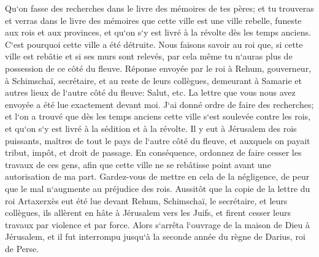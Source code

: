 \verse Qu`on fasse des recherches dans le livre des mémoires de tes pères; et tu trouveras et verras dans le livre des mémoires que cette ville est une ville rebelle, funeste aux rois et aux provinces, et qu`on s`y est livré à la révolte dès les temps anciens. C`est pourquoi cette ville a été détruite. 
\verse Nous faisons savoir au roi que, si cette ville est rebâtie et si ses murs sont relevés, par cela même tu n`auras plus de possession de ce côté du fleuve. 
\verse Réponse envoyée par le roi à Rehum, gouverneur, à Schimschaï, secrétaire, et au reste de leurs collègues, demeurant à Samarie et autres lieux de l`autre côté du fleuve: Salut, etc. 
\verse La lettre que vous nous avez envoyée a été lue exactement devant moi. 
\verse J`ai donné ordre de faire des recherches; et l`on a trouvé que dès les temps anciens cette ville s`est soulevée contre les rois, et qu`on s`y est livré à la sédition et à la révolte. 
\verse Il y eut à Jérusalem des rois puissants, maîtres de tout le pays de l`autre côté du fleuve, et auxquels on payait tribut, impôt, et droit de passage. 
\verse En conséquence, ordonnez de faire cesser les travaux de ces gens, afin que cette ville ne se rebâtisse point avant une autorisation de ma part. 
\verse Gardez-vous de mettre en cela de la négligence, de peur que le mal n`augmente au préjudice des rois. 
\verse Aussitôt que la copie de la lettre du roi Artaxerxès eut été lue devant Rehum, Schimschaï, le secrétaire, et leurs collègues, ils allèrent en hâte à Jérusalem vers les Juifs, et firent cesser leurs travaux par violence et par force. 
\verse Alors s`arrêta l`ouvrage de la maison de Dieu à Jérusalem, et il fut interrompu jusqu`à la seconde année du règne de Darius, roi de Perse. 

\chapter{}

